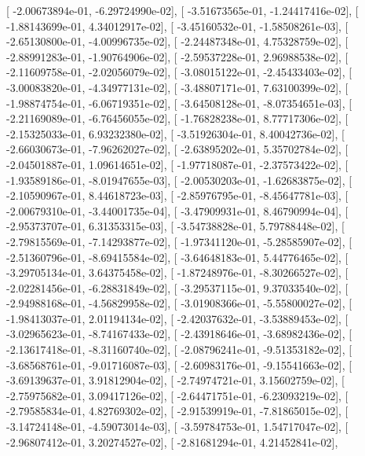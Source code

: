 \documentclass{article}
\begin{document}
       [ -2.00673894e-01,  -6.29724990e-02],
       [ -3.51673565e-01,  -1.24417416e-02],
       [ -1.88143699e-01,   4.34012917e-02],
       [ -3.45160532e-01,  -1.58508261e-03],
       [ -2.65130800e-01,  -4.00996735e-02],
       [ -2.24487348e-01,   4.75328759e-02],
       [ -2.88991283e-01,  -1.90764906e-02],
       [ -2.59537228e-01,   2.96988538e-02],
       [ -2.11609758e-01,  -2.02056079e-02],
       [ -3.08015122e-01,  -2.45433403e-02],
       [ -3.00083820e-01,  -4.34977131e-02],
       [ -3.48807171e-01,   7.63100399e-02],
       [ -1.98874754e-01,  -6.06719351e-02],
       [ -3.64508128e-01,  -8.07354651e-03],
       [ -2.21169089e-01,  -6.76456055e-02],
       [ -1.76828238e-01,   8.77717306e-02],
       [ -2.15325033e-01,   6.93232380e-02],
       [ -3.51926304e-01,   8.40042736e-02],
       [ -2.66030673e-01,  -7.96262027e-02],
       [ -2.63895202e-01,   5.35702784e-02],
       [ -2.04501887e-01,   1.09614651e-02],
       [ -1.97718087e-01,  -2.37573422e-02],
       [ -1.93589186e-01,  -8.01947655e-03],
       [ -2.00530203e-01,  -1.62683875e-02],
       [ -2.10590967e-01,   8.44618723e-03],
       [ -2.85976795e-01,  -8.45647781e-03],
       [ -2.00679310e-01,  -3.44001735e-04],
       [ -3.47909931e-01,   8.46790994e-04],
       [ -2.95373707e-01,   6.31353315e-03],
       [ -3.54738828e-01,   5.79788448e-02],
       [ -2.79815569e-01,  -7.14293877e-02],
       [ -1.97341120e-01,  -5.28585907e-02],
       [ -2.51360796e-01,  -8.69415584e-02],
       [ -3.64648183e-01,   5.44776465e-02],
       [ -3.29705134e-01,   3.64375458e-02],
       [ -1.87248976e-01,  -8.30266527e-02],
       [ -2.02281456e-01,  -6.28831849e-02],
       [ -3.29537115e-01,   9.37033540e-02],
       [ -2.94988168e-01,  -4.56829958e-02],
       [ -3.01908366e-01,  -5.55800027e-02],
       [ -1.98413037e-01,   2.01194134e-02],
       [ -2.42037632e-01,  -3.53889453e-02],
       [ -3.02965623e-01,  -8.74167433e-02],
       [ -2.43918646e-01,  -3.68982436e-02],
       [ -2.13617418e-01,  -8.31160740e-02],
       [ -2.08796241e-01,  -9.51353182e-02],
       [ -3.68568761e-01,  -9.01716087e-03],
       [ -2.60983176e-01,  -9.15541663e-02],
       [ -3.69139637e-01,   3.91812904e-02],
       [ -2.74974721e-01,   3.15602759e-02],
       [ -2.75975682e-01,   3.09417126e-02],
       [ -2.64471751e-01,  -6.23093219e-02],
       [ -2.79585834e-01,   4.82769302e-02],
       [ -2.91539919e-01,  -7.81865015e-02],
       [ -3.14724148e-01,  -4.59073014e-03],
       [ -3.59784753e-01,   1.54717047e-02],
       [ -2.96807412e-01,   3.20274527e-02],
       [ -2.81681294e-01,   4.21452841e-02],
\end{document}

